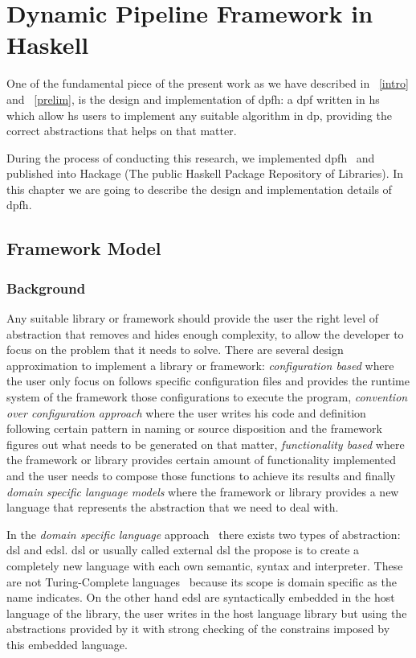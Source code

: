 \chapter{Dynamic Pipeline Framework in Haskell}\label{dp-hs}
One of the fundamental piece of the present work as we have described in ~\autoref{intro} and ~\autoref{prelim},
is the design and implementation of \acrfull{dpfh}: a \acrshort{dpf} written in \acrshort{hs} which allow \acrshort{hs} users
to implement any suitable algorithm in \acrshort{dp}, providing the correct abstractions that helps on that matter.

During the process of conducting this research, we implemented \acrshort{dpfh}~\cite{dynamic-pipeline} and published into 
Hackage (The public Haskell Package Repository of Libraries).
In this chapter we are going to describe the design and implementation details of \acrshort{dpfh}.

\section{Framework Model}

\subsection{Background}
Any suitable library or framework should provide the user the right level of abstraction that removes and hides enough complexity, 
to allow the developer to focus on the problem that it needs to solve.
There are several design approximation to implement a library or framework: \emph{configuration based} where the user only 
focus on follows specific configuration files and provides the runtime system of the framework those configurations to execute the program,
\emph{convention over configuration approach} where the user writes his code and definition following certain pattern in naming or source disposition 
and the framework figures out what needs to be generated on that matter, \emph{functionality based} where the framework or library provides certain amount
of functionality implemented and the user needs to compose those functions to achieve its results and finally \emph{domain specific language models} where 
the framework or library provides a new language that represents the abstraction that we need to deal with. 

In the \emph{domain specific language} approach~\cite{dsl} there exists two types of abstraction: \acrfull{dsl} and \acrfull{edsl}. \acrshort{dsl} or 
usually called external \acrshort{dsl} the propose is to create a completely new language with each own semantic, syntax and interpreter. These are not 
Turing-Complete languages~\cite{turing-comp} because its scope is domain specific as the name indicates. On the other hand \acrshort{edsl} are syntactically 
embedded in the host language of the library, the user writes in the host language library but using the abstractions provided by it with strong checking of 
the constrains imposed by this embedded language.

